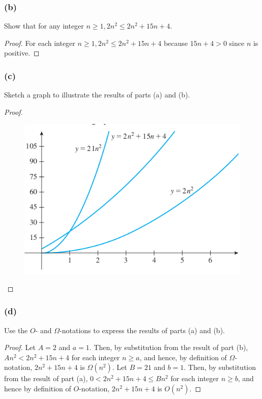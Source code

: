 \documentclass[14pt]{extarticle}
\begin{document}
\subsubsection{(b)}
Show that for any integer \(n \geq 1, 2n^2 \leq 2n^2 + 15n + 4\).

\begin{proof}
For each integer \(n \geq 1, 2n^2 \leq 2n^2 + 15n + 4\) because \(15n + 4 > 0\) since \(n\) is positive.
\end{proof}

\subsubsection{(c)}
Sketch a graph to illustrate the results of parts (a) and (b).
\begin{proof}
\begin{figure}[ht!]
\centering
\includegraphics[scale=0.5]{../images/11.2.10.c.png}
\end{figure}
\end{proof}

\subsubsection{(d)}
Use the \(O\)- and \(\Omega\)-notations to express the results of parts (a) and (b).

\begin{proof}
Let \(A = 2\) and \(a = 1\). Then, by substitution from the result of part (b), \(An^2 < 2n^2 + 15n + 4\) for each integer 
\(n \geq a\), and hence, by definition of \(\Omega\)-notation, \(2n^2 + 15n + 4\) is \(\Omega(n^2)\). Let \(B = 21\) and 
\(b = 1\). Then, by substitution from the result of part (a), \(0< 2n^2 + 15n + 4 \leq Bn^2\) for each integer \(n \geq b\), 
and hence by definition of \(O\)-notation, \(2n^2 + 15n + 4\) is \(O(n^2)\).
\end{proof}
\end{document}
